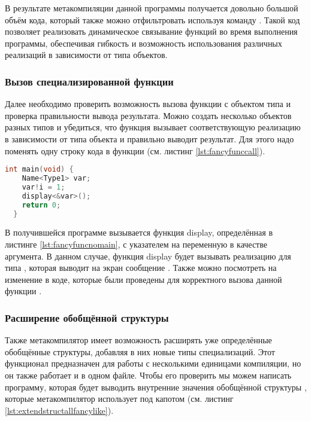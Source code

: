 В результате метакомпиляции данной программы получается довольно большой объём кода, который также можно отфильтровать используя команду 
.
Такой код позволяет реализовать динамическое связывание функций во время выполнения программы, обеспечивая гибкость и возможность использования различных реализаций в зависимости от типа объектов.

\subsubsection{Вызов специализированной функции}
Далее необходимо проверить возможность вызова функции  с объектом типа  и проверка правильности вывода результата. Можно создать несколько объектов разных типов  и убедиться, что функция  вызывает соответствующую реализацию в зависимости от типа объекта и правильно выводит результат.
Для этого надо поменять одну строку кода в функции  (см. листинг \ref{lst:fancyfunccall}).

\begin{lstlisting}[language=c, caption={Вызов специализированной функции}, label={lst:fancyfunccall}]
  int main(void) {
    Name<Type1> var;
    var!i = 1;
    display<&var>();
    return 0;
  }
\end{lstlisting}

В получившейся программе вызывается функция display, определённая в листинге \ref{lst:fancyfuncnomain}, с указателем на переменную  в качестве аргумента.
В данном случае, функция display будет вызывать реализацию  для типа , которая выводит на экран сообщение .
Также можно посмотреть на изменение в коде, которые были проведены для корректного вызова данной функции
.

\subsubsection{Расширение обобщённой структуры}
Также метакомпилятор имеет возможность расширять уже определённые обобщённые структуры, добавляя в них новые типы специализаций.
Этот функционал предназначен для работы с несколькими единицами компиляции, но он также работает и в одном файле.
Чтобы его проверить мы можем написать программу, которая будет выводить внутренние значения обобщённой структуры ,
которые метакомпилятор использует под капотом (см. листинг \ref{lst:extendstructallfancylike}).

